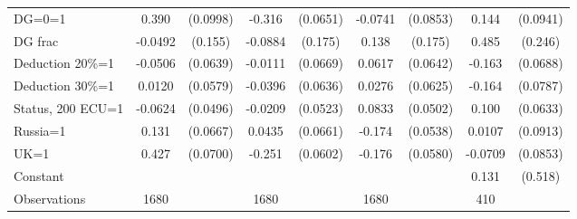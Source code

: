 \begin{tabular}{l|cccccc|cc}
DG=0=1          &    0.390\sym{***}& (0.0998)&   -0.316\sym{***}& (0.0651)&  -0.0741         & (0.0853)&    0.144         & (0.0941)\\
DG frac         &  -0.0492         &  (0.155)&  -0.0884         &  (0.175)&    0.138         &  (0.175)&    0.485\sym{*}  &  (0.246)\\
Deduction 20\%=1&  -0.0506         & (0.0639)&  -0.0111         & (0.0669)&   0.0617         & (0.0642)&   -0.163\sym{**} & (0.0688)\\
Deduction 30\%=1&   0.0120         & (0.0579)&  -0.0396         & (0.0636)&   0.0276         & (0.0625)&   -0.164\sym{**} & (0.0787)\\
Status, 200 ECU=1&  -0.0624         & (0.0496)&  -0.0209         & (0.0523)&   0.0833\sym{*}  & (0.0502)&    0.100         & (0.0633)\\
Russia=1        &    0.131\sym{**} & (0.0667)&   0.0435         & (0.0661)&   -0.174\sym{***}& (0.0538)&   0.0107         & (0.0913)\\
UK=1            &    0.427\sym{***}& (0.0700)&   -0.251\sym{***}& (0.0602)&   -0.176\sym{***}& (0.0580)&  -0.0709         & (0.0853)\\
Constant        &                  &         &                  &         &                  &         &    0.131         &  (0.518)\\
\hline
Observations    &     1680         &         &     1680         &         &     1680         &         &      410         &         \\


\end{tabular}
